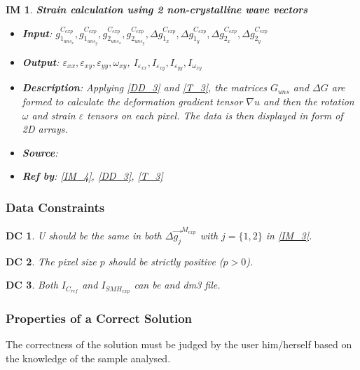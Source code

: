 \documentclass[12pt]{article}
\newtheorem{DC}{DC}
\newtheorem{IM}{IM}
\begin{document}
\begin{IM}
\label{IM_5}
\noindent\colorbox{shadecolorIM}{\normalfont \textbf{Strain calculation using 2 non-crystalline wave vectors}}
\normalfont
\begin{itemize}
\item \textbf{Input}: $g_{1_{{uns}_x}}^{C_{exp}}, g_{1_{{uns}_y}}^{C_{exp}},g_{2_{{uns}_x}}^{C_{exp}}, g_{2_{{uns}_y}}^{C_{exp}}, \Delta g_{1_{x}}^{C_{exp}}, \Delta g_{1_{y}}^{C_{exp}},\Delta g_{2_{x}}^{C_{exp}},\Delta g_{2_{y}}^{C_{exp}}$
\item \textbf{Output}: $\varepsilon_{xx},\varepsilon_{xy},\varepsilon_{yy},\omega_{xy}$, $I_{\varepsilon_{xx}},I_{\varepsilon_{xy}},I_{\varepsilon_{yy}},I_{\omega_{xy}}$
\item \textbf{Description}: Applying \cref{DD_3} and \cref{T_3}, the matrices $G_{uns}$ and $\Delta G$ are formed to calculate the deformation gradient tensor $\nabla u$ and then the rotation $\omega$ and strain $\varepsilon$ tensors on each pixel. The data is then displayed in form of 2D arrays.
\item \textbf{Source}: \cite{Hytch1998,Rouviere2005}
\item \textbf{Ref by}: \cref{IM_4}, \cref{DD_3}, \cref{T_3}
\end{itemize}
\end{IM}

\subsubsection{Data Constraints} \label{sec_DataConstraints}

\begin{DC}
\label{DC_1}
\normalfont U should be the same in both $\Delta \overrightarrow{g_{j}}^{M_{exp}}$ with $j=\{1,2\}$ in \cref{IM_3}.
\end{DC}    
\begin{DC}
\label{DC_2}
\normalfont The pixel size $p$ should be strictly positive ($p>0$).
\end{DC}
\begin{DC}
\label{DC_3}
\normalfont Both $I_{C_{ref}}$ and $I_{SMH_{exp}}$ can be and dm3 file.
\end{DC}

\subsubsection{Properties of a Correct Solution} \label{sec_CorrectSolution}

\noindent
The correctness of the solution must be judged by the user him/herself based on the knowledge of the sample analysed.
\end{document}
